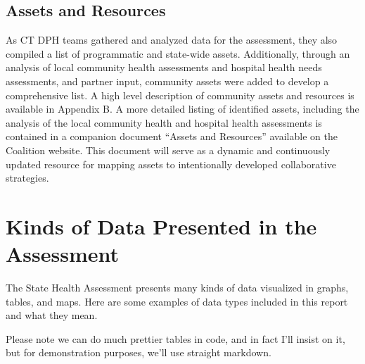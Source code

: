 \documentclass[
  letterpaper,
  DIV=11,
  numbers=noendperiod]{scrreprt}
\begin{document}
\subsection{Assets and Resources}\label{assets-and-resources}

As CT DPH teams gathered and analyzed data for the assessment, they also
compiled a list of programmatic and state-wide assets. Additionally,
through an analysis of local community health assessments and hospital
health needs assessments, and partner input, community assets were added
to develop a comprehensive list. A high level description of community
assets and resources is available in Appendix B. A more detailed listing
of identified assets, including the analysis of the local community
health and hospital health assessments is contained in a companion
document ``Assets and Resources'' available on the Coalition website.
This document will serve as a dynamic and continuously updated resource
for mapping assets to intentionally developed collaborative strategies.

\section{Kinds of Data Presented in the
Assessment}\label{kinds-of-data-presented-in-the-assessment}

The State Health Assessment presents many kinds of data visualized in
graphs, tables, and maps. Here are some examples of data types included
in this report and what they mean.

\begin{tcolorbox}[enhanced jigsaw, toptitle=1mm, opacityback=0, toprule=.15mm, title=\textcolor{quarto-callout-important-color}{\faExclamation}\hspace{0.5em}{Important}, rightrule=.15mm, bottomtitle=1mm, leftrule=.75mm, left=2mm, colback=white, breakable, opacitybacktitle=0.6, colbacktitle=quarto-callout-important-color!10!white, titlerule=0mm, arc=.35mm, colframe=quarto-callout-important-color-frame, bottomrule=.15mm, coltitle=black]

Please note we can do much prettier tables in code, and in fact I'll
insist on it, but for demonstration purposes, we'll use straight
markdown.

\end{tcolorbox}
\end{document}
